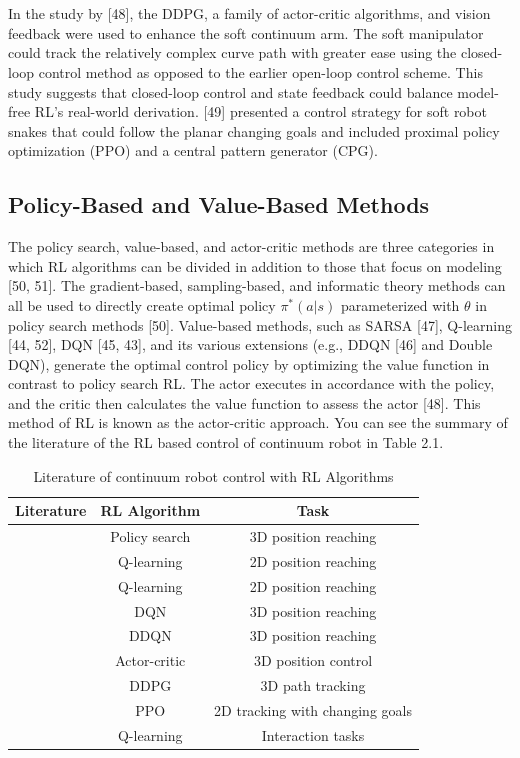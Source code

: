 \documentclass[12pt,twoside,a4]{mwbk}
\begin{document}
\\ \\
In the study by [48], the DDPG, a family of actor-critic algorithms, and vision feedback were used to enhance the soft continuum arm. The soft manipulator could track the relatively complex curve path with greater ease using the closed-loop control method as opposed to the earlier open-loop control scheme. This study suggests that closed-loop control and state feedback could balance model-free RL's real-world derivation. [49] presented a control strategy for soft robot snakes that could follow the planar changing goals and included proximal policy optimization (PPO) and a central pattern generator (CPG).

\subsection{Policy-Based and Value-Based Methods}
The policy search, value-based, and actor-critic methods are three categories in which RL algorithms can be divided in addition to those that focus on modeling [50, 51]. The gradient-based, sampling-based, and informatic theory methods can all be used to directly create optimal policy $\pi^{*}(a|s)$ parameterized with $\theta$ in policy search methods [50]. Value-based methods, such as SARSA [47], Q-learning [44, 52], DQN [45, 43], and its various extensions (e.g., DDQN [46] and Double DQN), generate the optimal control policy by optimizing the value function in contrast to policy search RL. The actor executes in accordance with the policy, and the critic then calculates the value function to assess the actor [48]. This method of RL is known as the actor-critic approach. You can see the summary of the literature of the RL based control of continuum robot in Table 2.1. 

\begin{table}[h!]
\centering
\begin{adjustbox}{width=1\textwidth}
\begin{tabular}{||c c c||} 
 \hline
 \textbf{Literature} &\textbf{RL Algorithm} & \textbf{Task} \\ [0.5ex] 
 \hline\hline
 [42] & Policy search & 3D position reaching \\ 
 \hline
 [43] & Q-learning & 2D position reaching \\
 \hline
 [44] & Q-learning & 2D position reaching \\
 \hline
 [45] & DQN & 3D position reaching \\
 \hline
 [46] & DDQN & 3D position reaching \\ 
 \hline
 [47] & Actor-critic & 3D position control \\
 \hline
 [48] & DDPG & 3D path tracking \\
 \hline
 [49] & PPO & 2D tracking with changing goals \\ 
 \hline
 [52] & Q-learning & Interaction tasks \\ [1ex]
 \hline
\end{tabular}
\end{adjustbox}
\caption{Literature of continuum robot control with RL Algorithms}
\end{table}
\end{document}
